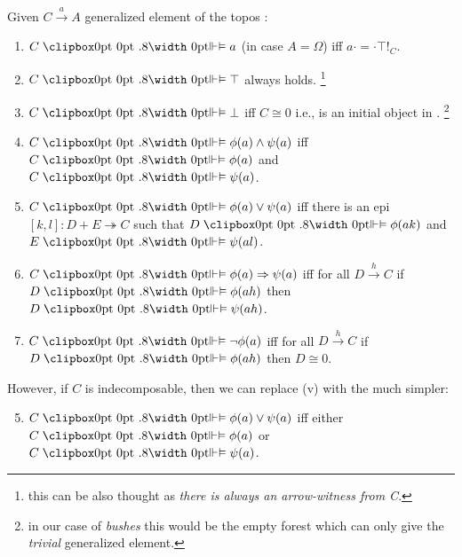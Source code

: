 \begin{definition}
	Given $C \xrightarrow{a} A$ generalized element of the topos :
	\begin{enumerate}[label=(\roman*)]
		\item $C \VDashA a$ (in case $A=\Omega$) iff $a \cdot = \cdot \top !_C$. 
		\item $C \VDashA \top$ always holds. \footnote{this can be also thought as \emph{there is always an arrow-witness from C}.}
		\item $C \VDashA \bot$ iff $C \cong 0$ i.e., is an initial object in . \footnote{in our case of \emph{bushes} this would be the empty forest which can only give the \emph{trivial} generalized element.}
		\item $C \VDashA \phi(a) \land \psi(a)$ iff $C \VDashA \phi(a) $ and $C \VDashA \psi(a)$.
		\item $C \VDashA \phi(a) \lor \psi(a)$ iff there is an epi $[k,l]: D+E \twoheadrightarrow C$ such that $D \VDashA \phi(ak)$ and $E \VDashA \psi(al)$.
		\item $C \VDashA \phi(a) \Rightarrow \psi(a)$ iff for all $D \xrightarrow{h} C$ if $D \VDashA \phi(ah)$ then $D \VDashA \psi(ah)$.
		\item $C \VDashA \neg\phi(a)$ iff for all $D \xrightarrow{h} C$ if $D \VDashA \phi(ah)$ then $D \cong 0$.
	\end{enumerate}
	However, if $C$ is indecomposable, then we can replace (v) with the much simpler:
	\begin{enumerate}[label=(\roman*)']
		\setcounter{enumi}{4}
		\item $C \VDashA \phi(a) \lor \psi(a)$ iff either $C \VDashA \phi(a)$ or $C \VDashA \psi(a)$.
	\end{enumerate} 


\end{definition}
